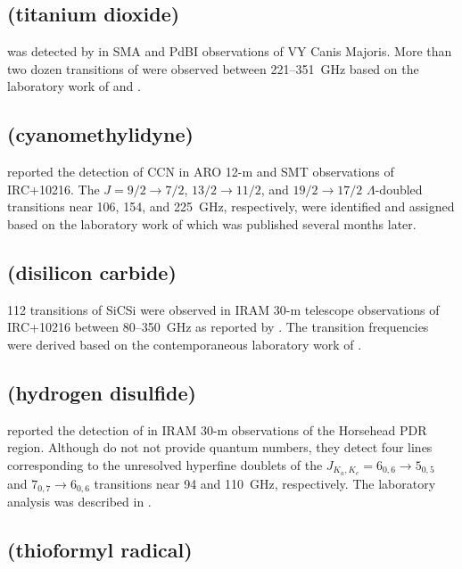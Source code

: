 \documentclass[twocolumn]{aastex631}
\begin{document}
	\subsection{ (titanium dioxide)}
	\label{TiO2}
	
	 was detected by \citet{Kaminski:2013gk} in SMA and PdBI observations of VY Canis Majoris.  More than two dozen transitions of  were observed between 221--351~GHz based on the laboratory work of \citet{Brunken:2008rt} and \citet{Kania:2011gp}.
	
	\subsection{ (cyanomethylidyne)}
	\label{CCN}
	
	\citet{Anderson:2014kt} reported the detection of CCN in ARO 12-m and SMT observations of IRC+10216.  The $J = 9/2\rightarrow7/2$, $13/2\rightarrow11/2$, and $19/2\rightarrow17/2$ $\Lambda$-doubled transitions near 106, 154, and 225~GHz, respectively, were identified and assigned based on the laboratory work of \citet{Anderson:2015op} which was published several months later.
	
	\subsection{ (disilicon carbide)}
	\label{SiCSi}
	
	112 transitions of SiCSi were observed in IRAM 30-m telescope observations of IRC+10216 between 80--350~GHz as reported by \citet{Cernicharo:2015cw}.  The transition frequencies were derived based on the contemporaneous laboratory work of \citet{McCarthy:2015do}.
	
	\subsection{ (hydrogen disulfide)}
	\label{S2H}
	
	\citet{Fuente:2017gd} reported the detection of  in IRAM 30-m observations of the Horsehead PDR region.  Although \citet{Fuente:2017gd} do not not provide quantum numbers, they detect four lines corresponding to the unresolved hyperfine doublets of the $J_{K_a,K_c} = 6_{0,6}\rightarrow5_{0,5}$ and $7_{0,7}\rightarrow6_{0,6}$ transitions near 94 and 110~GHz, respectively.  The laboratory analysis was described in \citet{Tanimoto:2000im}.
	
	\subsection{ (thioformyl radical)}
	\label{HCS}
	
\end{document}

